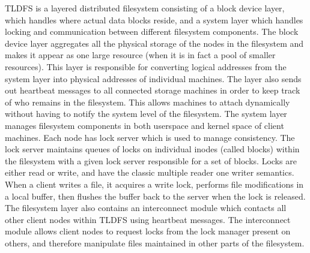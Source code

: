 TLDFS \cite{Wang2007} is a layered distributed filesystem consisting of a
block device layer, which handles where actual data blocks reside, and a
system layer which handles locking and communication between different
filesystem components. The block device layer aggregates all the physical
storage of the nodes in the filesystem and makes it appear as one large
resource (when it is in fact a pool of smaller resources). This layer is
responsible for converting logical addresses from the system layer into
physical addresses of individual machines. The layer also sends out heartbeat
messages to all connected storage machines in order to keep track of who
remains in the filesystem. This allows machines to attach dynamically without
having to notify the system level of the filesystem. The system layer manages
filesystem components in both userspace and kernel space of client machines.
Each node has lock server which is used to manage consistency. The lock server
maintains queues of locks on individual inodes (called blocks) within the
filesystem with a given lock server responsible for a set of blocks. Locks are
either read or write, and have the classic multiple reader one writer
semantics. When a client writes a file, it acquires a write lock, performs
file modifications in a local buffer, then flushes the buffer back to the
server when the lock is released. The filesystem layer also contains an
interconnect module which contacts all other client nodes within TLDFS using
heartbeat messages. The interconnect module allows client nodes to request
locks from the lock manager present on others, and therefore manipulate files
maintained in other parts of the filesystem.


